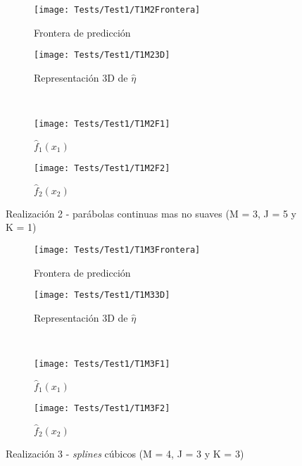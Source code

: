 \documentclass[../Main/Main.tex]{subfiles}
\begin{document}
\begin{figure}[p]
	\centering
	\begin{subfigure}[b]{0.45\textwidth}
    	\texttt{[image: Tests/Test1/T1M2Frontera]}
		\caption{Frontera de predicción}
		\label{fig:T1M2Frontera}
	\end{subfigure}
	\hfill    
    \begin{subfigure}[b]{0.45\textwidth}
        \texttt{[image: Tests/Test1/T1M23D]}
        \caption{Representación 3D de $\hat{\eta}$}
        \label{fig:T1M23D}
    \end{subfigure}
    \\[3pt]
    \begin{subfigure}[b]{0.45\textwidth}
    	\texttt{[image: Tests/Test1/T1M2F1]}
		\caption{$\hat{f}_1(x_1)$}
		\label{fig:T1M2F1}
	\end{subfigure}
	\hfill    
    \begin{subfigure}[b]{0.45\textwidth}
        \texttt{[image: Tests/Test1/T1M2F2]}
        \caption{$\hat{f}_2(x_2)$}
        \label{fig:T1M2F2}
    \end{subfigure}
    \caption{Realización 2 - parábolas continuas mas no suaves (M = 3, J = 5 y K = 1)}
    \label{fig:T1M2}
\end{figure}

\begin{figure}[p]
	\centering
	\begin{subfigure}[b]{0.45\textwidth}
    	\texttt{[image: Tests/Test1/T1M3Frontera]}
		\caption{Frontera de predicción}
		\label{fig:T1M3Frontera}
	\end{subfigure}
	\hfill    
    \begin{subfigure}[b]{0.45\textwidth}
        \texttt{[image: Tests/Test1/T1M33D]}
        \caption{Representación 3D de $\hat{\eta}$}
        \label{fig:T1M33D}
    \end{subfigure}
    \\[3pt]
    \begin{subfigure}[b]{0.45\textwidth}
    	\texttt{[image: Tests/Test1/T1M3F1]}
		\caption{$\hat{f}_1(x_1)$}
		\label{fig:T1M3F1}
	\end{subfigure}
	\hfill    
    \begin{subfigure}[b]{0.45\textwidth}
        \texttt{[image: Tests/Test1/T1M3F2]}
        \caption{$\hat{f}_2(x_2)$}
        \label{fig:T1M3F2}
    \end{subfigure}
    \caption{Realización 3 - \textit{splines} cúbicos (M = 4, J = 3 y K = 3)}
    \label{fig:T1M3}
\end{figure}
\end{document}
